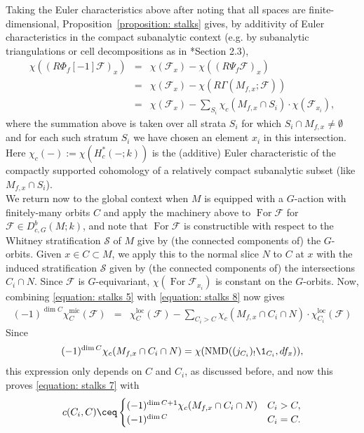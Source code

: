\documentclass[11pt,letterpaper]{amsart}
\numberwithin{equation}{section}
\begin{document}
Taking the Euler characteristics above after noting that all spaces are finite-dimensional,  Proposition~\ref{proposition: stalks} gives, by additivity of Euler characteristics in the compact subanalytic context (e.g. by subanalytic triangulations or cell decompositions as in \cite{Sch03}*{Section 2.3}),
\begin{equation}\label{equation: stalks 8}
\begin{array}{rcl}
\chi((R\Phi_f[-1]\mathcal{F})_x)  &=& 
\chi(\mathcal{F}_x) 
-
\chi((R\Psi_f\mathcal{F})_x) \\
&=& 
\chi(\mathcal{F}_x) 
-
\chi(R\Gamma(M_{f,x};\mathcal{F})) \\
&=& 
\chi(\mathcal{F}_x) 
-
\mathop{\sum}\limits_{S_i} 
\chi_c(M_{f,x}\cap S_i) \cdot 
\chi(\mathcal{F}_{x_i}), 
\end{array}
\end{equation}
where the summation above is taken over all strata $S_i$ for which $S_i\cap M_{f,x} \ne \emptyset$ and for each such stratum $S_i$ we have chosen an element $x_i$ in this intersection. Here $\chi_c(-):=\chi(H^*_c(-;k))$ is the (additive) Euler characteristic of the compactly supported cohomology of a relatively compact subanalytic subset (like $M_{f,x}\cap S_i$).\\

We return now to the global context when $M$ is equipped with a $G$-action with finitely-many orbits $C$ and apply the machinery above to $\operatorname{For}\mathcal{F}$ for $\mathcal{F} \in D^b_{c,G}(M;k)$, and note that $\operatorname{For}\mathcal{F}$ is constructible with respect to the Whitney stratification $\mathscr{S}$
of $M$ give by (the connected components of) the $G$-orbits.
Given $x \in C \subset M$, we apply this to the normal slice $N$ to $C$ at $x$ with the induced stratification $\mathcal{S}$ given by (the connected components of) the intersections $C_i\cap N$. 
Since $\mathcal{F}$ is $G$-equivariant,  $\chi(\operatorname{For}\mathcal{F}_{x_i})$ is constant on the $G$-orbits.
Now, combining \eqref{equation: stalks 5} with \eqref{equation: stalks 8} now gives
\[
\begin{array}{rcl}
(-1)^{\dim C}\chi^\textrm{mic}_{C}(\mathcal{F})
&=&
\chi^\textrm{loc}_{C}(\mathcal{F})
-
\mathop{\sum}\limits_{C_i > C}\chi_c(M_{f,x}\cap C_i\cap N)\cdot
\chi^\textrm{loc}_{C_i}(\mathcal{F})
\end{array}
\]
Since
\[
(-1)^{\dim C}\chi_c(M_{f,x}\cap C_i\cap N)
=
\chi(\operatorname{NMD}((j_{C_i})_!\1_{C_i},df_x)),
\]
this expression only depends on $C$ and $C_i$, as discussed before, and now this proves \eqref{equation: stalks 7} with 
\[
c(C_i,C) \ceq  
\begin{cases}
(-1)^{\dim C +1} \chi_c(M_{f,x}\cap C_i\cap N) & C_i > C,\\
(-1)^{\dim C} & C_i = C.
\end{cases}
\]
\end{document}
